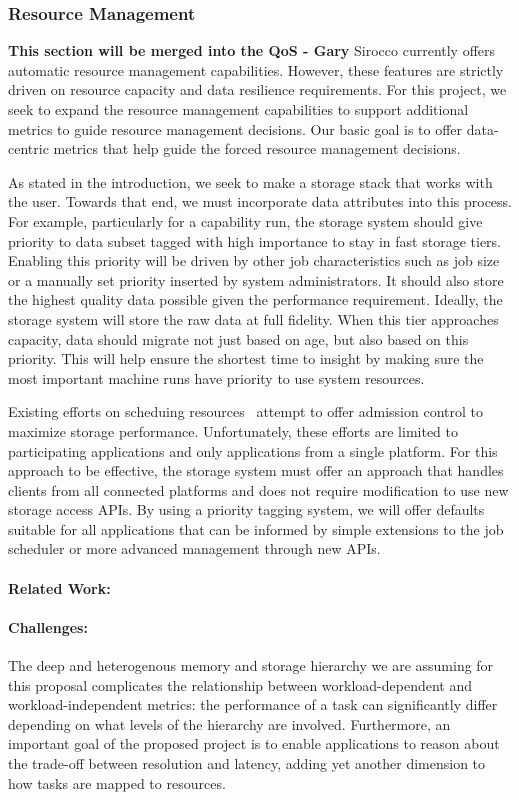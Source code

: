 \subsubsection{Resource Management}
{\bf {\color{red} This section will be merged into the QoS - Gary}}
Sirocco currently offers automatic resource management capabilities. However,
these features are strictly driven on resource capacity and data resilience
requirements. For this project, we seek to expand the resource management
capabilities to support additional metrics to guide resource management
decisions. Our basic goal is to offer data-centric metrics that help guide the
forced resource management decisions.

As stated in the introduction, we seek to make a storage stack that works with
the user. Towards that end, we must incorporate data attributes into this
process. For example, particularly for a capability run, the storage system
should give priority to data subset tagged with high importance to stay in fast
storage tiers. Enabling this priority will be driven by other job
characteristics such as job size or a manually set priority inserted by system
administrators. It should also store the highest quality data possible given
the performance requirement. Ideally, the storage system will store the raw
data at full fidelity. When this tier approaches capacity, data should migrate
not just based on age, but also based on this priority. This will help ensure
the shortest time to insight by making sure the most important machine runs
have priority to use system resources.

Existing efforts on scheduing resources~\cite{io-cop,dorier} attempt to offer
admission control to maximize storage performance. Unfortunately, these efforts
are limited to participating applications and only applications from a single
platform. For this approach to be effective, the storage system must offer an
approach that handles clients from all connected platforms and does not
require modification to use new storage access APIs. By using a priority
tagging system, we will offer defaults suitable for all applications that can
be informed by simple extensions to the job scheduler or more advanced
management through new APIs.

\paragraph{Related Work:}

\paragraph{Challenges:} The deep and heterogenous memory and storage
hierarchy we are assuming for this proposal complicates the
relationship between workload-dependent and workload-independent
metrics: the performance of a task can significantly differ depending
on what levels of the hierarchy are involved. Furthermore, an
important goal of the proposed project is to enable applications
to reason about the trade-off between resolution and latency, adding
yet another dimension to how tasks are mapped to resources.

